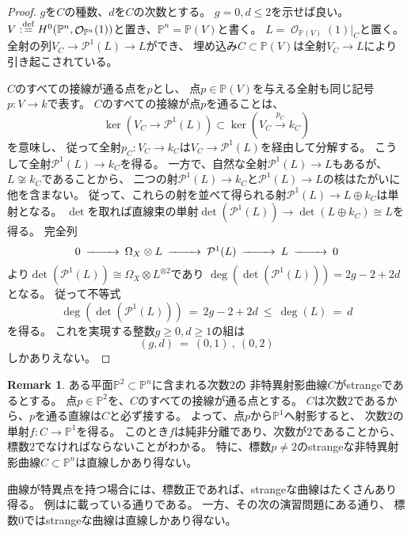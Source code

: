 \documentclass[uplatex]{jsarticle}
\theoremstyle{definition}
\newtheorem{rem}[rem]{Remark}
\renewcommand{\P}{\mathbb{P}}
\newcommand{\mcO}{\mathcal{O}}
\newcommand{\mcP}{\mathcal{P}}
\DeclareMathOperator{\OOO}{\mcO}
\newcommand{\OO}[1]{\OOO_{#1}}
\newcommand{\dfn}{:\overset{\mathrm{\scriptsize def}}{=}}
\begin{document}
\begin{proof}
  \(g\)を\(C\)の種数、\(d\)を\(C\)の次数とする。
  \(g = 0,d\leq 2\)を示せば良い。
  \(V\dfn H^0(\P^n,\OO{\P^n}(1))\)と置き、\(\P^n=\P(V)\)と書く。
  \(L = \OO{\P(V)}(1)|_C\)と置く。
  全射の列\(V_C\to \mcP^1(L) \to L\)ができ、
  埋め込み\(C\subset \P(V)\)は全射\(V_C\to L\)により引き起こされている。

  \(C\)のすべての接線が通る点を\(p\)とし、
  点\(p\in \P(V)\)を与える全射も同じ記号\(p:V\to k\)で表す。
  \(C\)のすべての接線が点\(p\)を通ることは、
  \[
  \ker(V_C\to \mcP^1(L)) \subset \ker(V_C\xrightarrow{p_C} k_C)
  \]
  を意味し、
  従って全射\(p_C : V_C\to k_C\)は\(V_C\to \mcP^1(L)\)を経由して分解する。
  こうして全射\(\mcP^1(L)\to k_C\)を得る。
  一方で、自然な全射\(\mcP^1(L)\to L\)もあるが、
  \(L\not\cong k_C\)であることから、
  二つの射\(\mcP^1(L)\to k_C\)と\(\mcP^1(L)\to L\)の核はたがいに他を含まない。
  従って、これらの射を並べて得られる射\(\mcP^1(L) \to L\oplus k_C\)は単射となる。
  \(\det\)を取れば直線束の単射\(\det(\mcP^1(L)) \to \det(L\oplus k_C) \cong L\)を得る。
  完全列
  \[
  \begin{CD}
    0 @>>> \Omega_X\otimes L @>>> \mcP^1(L) @>>> L @>>> 0
  \end{CD}
  \]
  より\(\det(\mcP^1(L)) \cong \Omega_X \otimes L^{\otimes 2}\)であり
  \(\deg(\det(\mcP^1(L))) = 2g - 2 + 2d\)となる。
  従って不等式
  \[
  \deg(\det(\mcP^1(L))) \ = \ 2g - 2 + 2d \ \leq \ \deg(L) \ = \ d
  \]
  を得る。
  これを実現する整数\(g\geq 0, d\geq 1\)の組は
  \[
  (g,d) \ = \ (0,1) \ , \ (0,2)
  \]
  しかありえない。
\end{proof}


\begin{rem}
  ある平面\(\P^2\subset \P^n\)に含まれる次数\(2\)の
  非特異射影曲線\(C\)がstrangeであるとする。
  点\(p\in \P^2\)を、\(C\)のすべての接線が通る点とする。
  \(C\)は次数\(2\)であるから、\(p\)を通る直線は\(C\)と必ず接する。
  よって、点\(p\)から\(\P^1\)へ射影すると、
  次数\(2\)の単射\(f:C\to \P^1\)を得る。
  このとき\(f\)は純非分離であり、次数が\(2\)であることから、
  標数\(2\)でなければならないことがわかる。
  特に、標数\(p\neq 2\)のstrangeな非特異射影曲線\(C\subset \P^n\)は直線しかあり得ない。
\end{rem}



曲線が特異点を持つ場合には、標数正であれば、strangeな曲線はたくさんあり得る。
例は\cite[演習 IV.3.8.(a)]{Ha}に載っている通りである。
一方、その次の演習問題\cite[演習 IV.3.8.(b)]{Ha}にある通り、
標数\(0\)ではstrangeな曲線は直線しかあり得ない。
\end{document}
